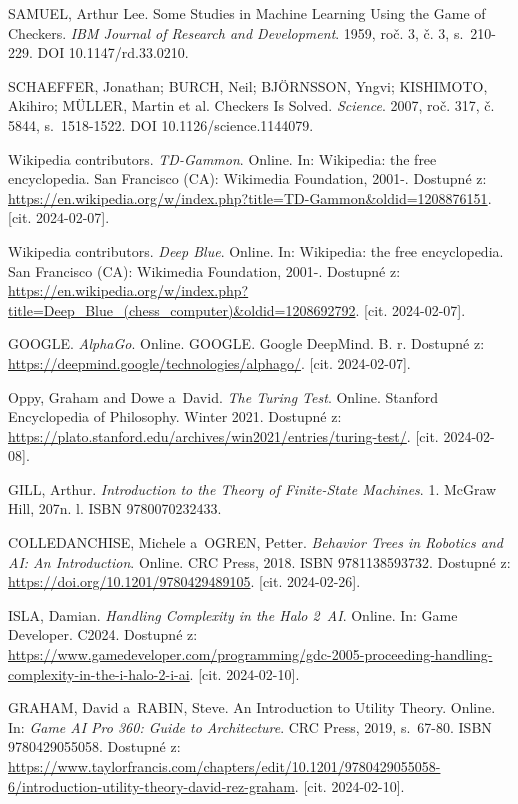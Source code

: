 SAMUEL, Arthur Lee. Some Studies in Machine Learning Using the Game of Checkers. \textit{IBM Journal of Research and Development}. 1959, roč. 3, č. 3, s.~210-229. DOI 10.1147/rd.33.0210.

SCHAEFFER, Jonathan; BURCH, Neil; BJÖRNSSON, Yngvi; KISHIMOTO, Akihiro; MÜLLER, Martin et al. Checkers Is Solved. \textit{Science}. 2007, roč. 317, č. 5844, s.~1518-1522. DOI 10.1126/science.1144079.

Wikipedia contributors. \textit{TD-Gammon}. Online. In: Wikipedia: the free encyclopedia. San Francisco (CA): Wikimedia Foundation, 2001-. Dostupné z: \url{https://en.wikipedia.org/w/index.php?title=TD-Gammon&oldid=1208876151}. [cit. 2024-02-07].

Wikipedia contributors. \textit{Deep Blue}. Online. In: Wikipedia: the free encyclopedia. San Francisco (CA): Wikimedia Foundation, 2001-. Dostupné z: \url{https://en.wikipedia.org/w/index.php?title=Deep\_Blue\_(chess\_computer)&oldid=1208692792}. [cit. 2024-02-07].

GOOGLE. \textit{AlphaGo}. Online. GOOGLE. Google DeepMind. B. r. Dostupné z: \url{https://deepmind.google/technologies/alphago/}. [cit. 2024-02-07].

Oppy, Graham and Dowe a~David. \textit{The Turing Test}. Online. Stanford Encyclopedia of Philosophy. Winter 2021. Dostupné z: \url{https://plato.stanford.edu/archives/win2021/entries/turing-test/}. [cit. 2024-02-08].

GILL, Arthur. \textit{Introduction to the Theory of Finite-State Machines}. 1. McGraw Hill, 207n. l. ISBN 9780070232433.

COLLEDANCHISE, Michele a~OGREN, Petter. \textit{Behavior Trees in Robotics and AI: An Introduction}. Online. CRC Press, 2018. ISBN 9781138593732. Dostupné z: \url{https://doi.org/10.1201/9780429489105}. [cit. 2024-02-26].

ISLA, Damian. \textit{Handling Complexity in the Halo 2~AI}. Online. In: Game Developer. C2024. Dostupné z: \url{https://www.gamedeveloper.com/programming/gdc-2005-proceeding-handling-complexity-in-the-i-halo-2-i-ai}. [cit. 2024-02-10].

GRAHAM, David  a~RABIN, Steve. An Introduction to Utility Theory. Online. In: \textit{Game AI Pro 360: Guide to Architecture}. CRC Press, 2019, s.~67-80. ISBN 9780429055058. Dostupné z: \url{https://www.taylorfrancis.com/chapters/edit/10.1201/9780429055058-6/introduction-utility-theory-david-rez-graham}. [cit. 2024-02-10].

